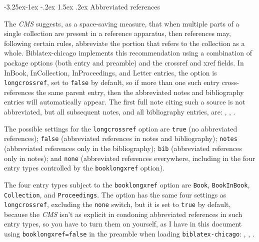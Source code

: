 \documentclass[a4paper,12pt]{article}
\makeatletter
\renewcommand{\section}{\@startsection{section}{1}{\z@}%
                                     {-3.25ex\@plus -1ex \@minus -.2ex}%
                                     {1.5ex \@plus .2ex}%
                                     {\normalfont\large\bfseries}}
\newcommand{\mylittlespace}{\vspace{5pt}}%
\makeatother
\begin{document}
\section{Abbreviated references }
\label{sec:abbrev}

\begin{refsection}

  The  \emph{CMS} suggests, as a
  space-saving measure, that when multiple parts of a single
  collection are present in a reference apparatus, then references
  may, following certain rules, abbreviate the portion that refers to
  the collection as a whole.  \textsf{Biblatex-chicago} implements
  this recommendation using a combination of package options (both
  entry and preamble) and the \textsf{crossref} and \textsf{xref}
  fields.  In \textsf{InBook}, \textsf{InCollection},
  \textsf{InProceedings}, and \textsf{Letter} entries, the option is
  \texttt{longcrossref}, set to \texttt{false} by default, so if more
  than one such entry cross-references the same parent entry, then the
  abbreviated notes and bibliography entries will automatically
  appear.  The first full note citing such a source is not
  abbreviated, but all subsequent notes, and all bibliography entries,
  are:\enlargethispage{-\baselineskip}
  ,
  ,
  .

\mylittlespace The possible settings for the \texttt{longcrossref}
option are \texttt{true} (no abbreviated references); \texttt{false}
(abbreviated references in notes and bibliography); \texttt{notes}
(abbreviated references only in the bibliography); \texttt{bib}
(abbreviated references only in notes); and \texttt{none} (abbreviated
references everywhere, including in the four entry types controlled by
the \texttt{booklongxref} option).

\mylittlespace The four entry types subject to the
\texttt{booklongxref} option are \texttt{Book}, \texttt{BookInBook},
\texttt{Collec\-tion}, and \texttt{Proceedings}.  The option has the
same four settings as \texttt{longcrossref}, excluding the
\texttt{none} switch, but it is set to \texttt{true} by default,
because the \emph{CMS} isn't as explicit in condoning abbreviated
references in such entry types, so you have to turn them on yourself,
as I have in this document using \texttt{booklongxref=false} in the
preamble when loading \texttt{biblatex-chi\-ca\-go}:
  ,
  ,
  .

  {\renewcommand{\notesname}{\normalsize Note Style} \theendnotes}
  \printbibliography[title=\normalsize Bibliography Style]
\end{refsection}
\end{document}
